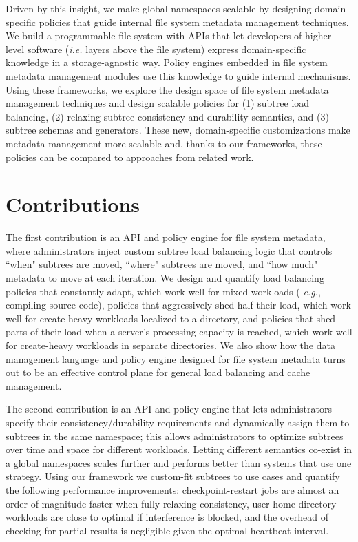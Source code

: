 Driven by this insight, we make global namespaces scalable by designing
domain-specific policies that guide internal file system metadata management
techniques. We build a programmable file system with APIs that let developers
of higher-level software ({\it i.e.} layers above the file system) express
domain-specific knowledge in a storage-agnostic way.  Policy engines embedded
in file system metadata management modules use this knowledge to guide internal
mechanisms. Using these frameworks, we explore the design space of file system
metadata management techniques and design scalable policies for (1) subtree
load balancing, (2) relaxing subtree consistency and durability semantics, and
(3) subtree schemas and generators.  These new, domain-specific customizations
make metadata management more scalable and, thanks to our frameworks, these
policies can be compared to approaches from related work. 

\section{Contributions}

The first contribution is an API and policy engine for file system metadata,
where administrators inject custom subtree load balancing logic that controls
``when" subtrees are moved, ``where" subtrees are moved, and ``how much"
metadata to move at each iteration.  We design and quantify load balancing
policies that constantly adapt, which work well for mixed workloads ({\it
e.g.}, compiling source code), policies that aggressively shed half their load,
which work well for create-heavy workloads localized to a directory, and
policies that shed parts of their load when a server's processing capacity is
reached, which work well for create-heavy workloads in separate directories.
We also show how the data management language and policy engine designed
for file system metadata turns out to be an effective control plane for general
load balancing and cache management.

The second contribution is an API and policy engine that lets administrators
specify their consistency/durability requirements and dynamically assign them
to subtrees in the same namespace; this allows administrators to optimize
subtrees over time and space for different workloads. Letting different
semantics co-exist in a global namespaces scales further and performs better
than systems that use one strategy.  Using our framework we custom-fit subtrees
to use cases and quantify the following performance improvements:
checkpoint-restart jobs are almost an order of magnitude faster when fully
relaxing consistency, user home directory workloads are close to optimal if
interference is blocked, and the overhead of checking for partial results is
negligible given the optimal heartbeat interval.

